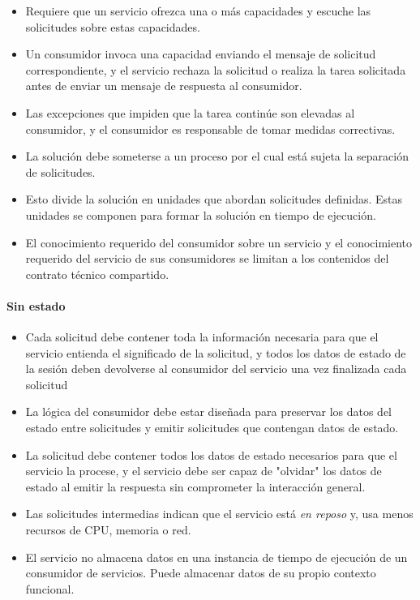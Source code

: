   
  	\begin{itemize}
  		\item Requiere que un servicio ofrezca una o más capacidades y escuche las solicitudes sobre estas capacidades. 
  		\item Un consumidor  invoca una capacidad enviando el mensaje de solicitud correspondiente, y el servicio rechaza la solicitud o realiza la tarea solicitada antes de enviar un mensaje de respuesta al consumidor.
  		\item Las excepciones que impiden que la tarea continúe son elevadas al consumidor, y el consumidor es responsable de tomar medidas correctivas. 
  	 
		\item La solución debe someterse a un proceso por el cual está sujeta la separación de solicitudes.
		\item  Esto divide la solución en unidades que abordan solicitudes definidas. Estas unidades se componen para formar la solución en tiempo de ejecución.
		\item El conocimiento requerido del consumidor sobre un servicio y el conocimiento requerido del servicio de sus consumidores se limitan a los contenidos del contrato técnico compartido. 
	\end{itemize}
	
	\paragraph{Sin estado}
 
		\begin{itemize}
			\item Cada solicitud  debe contener toda la información necesaria para que el servicio entienda el significado de la solicitud, y todos los datos de estado de la sesión deben devolverse al consumidor del servicio una vez finalizada  cada solicitud 
			\item La lógica del consumidor debe estar diseñada para preservar los datos del estado entre solicitudes y emitir solicitudes que contengan datos de estado.
			\item La solicitud debe contener todos los datos de estado necesarios para que el servicio la procese, y el servicio debe ser capaz de "olvidar" los datos de estado al emitir la respuesta sin comprometer la interacción general.
		 
				\item Las solicitudes intermedias indican que el servicio está \textit{en reposo} y, usa menos recursos de CPU, memoria o red.
				\item El servicio no almacena datos en una instancia de tiempo de ejecución de un consumidor de servicios. Puede almacenar datos de su propio contexto funcional.
			\end{itemize}	
		 
